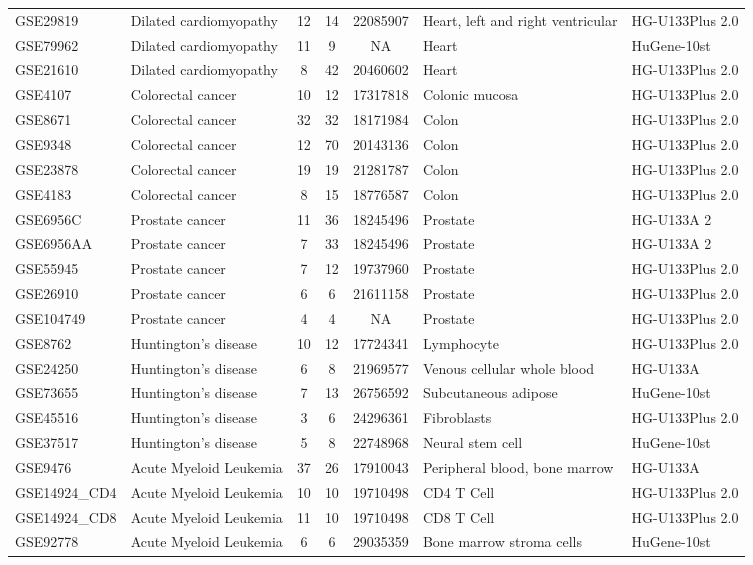 \documentclass[Minh_PhD_thesis.tex]{subfiles}
\begin{document}
\begin{landscape}
\begin{longtable}{lp{4cm}cccp{4cm}l}
GSE29819	&Dilated cardiomyopathy	&12	&14	&22085907	&Heart, left and right ventricular	&HG-U133Plus 2.0\\
GSE79962	&Dilated cardiomyopathy	&11	&9	&NA	&Heart	&HuGene-10st\\
GSE21610	&Dilated cardiomyopathy	&8	&42	&20460602	&Heart	&HG-U133Plus 2.0\\
GSE4107	&Colorectal cancer	&10	&12	&17317818	&Colonic mucosa	&HG-U133Plus 2.0\\
GSE8671	&Colorectal cancer	&32	&32	&18171984	&Colon	&HG-U133Plus 2.0\\
GSE9348	&Colorectal cancer	&12	&70	&20143136	&Colon	&HG-U133Plus 2.0\\
GSE23878	&Colorectal cancer	&19	&19	&21281787	&Colon	&HG-U133Plus 2.0\\
GSE4183	&Colorectal cancer	&8	&15	&18776587	&Colon	&HG-U133Plus 2.0\\
GSE6956C	&Prostate cancer	&11	&36	&18245496	&Prostate	&HG-U133A 2\\
GSE6956AA	&Prostate cancer	&7	&33	&18245496	&Prostate	&HG-U133A 2\\
GSE55945	&Prostate cancer	&7	&12	&19737960	&Prostate	&HG-U133Plus 2.0\\
GSE26910	&Prostate cancer	&6	&6	&21611158	&Prostate	&HG-U133Plus 2.0\\
GSE104749	&Prostate cancer	&4	&4	&NA	&Prostate	&HG-U133Plus 2.0\\
GSE8762	&Huntington’s disease	&10	&12	&17724341	&Lymphocyte	&HG-U133Plus 2.0\\
GSE24250	&Huntington’s disease	&6	&8	&21969577	&Venous cellular whole blood	&HG-U133A\\
GSE73655	&Huntington’s disease	&7	&13	&26756592	&Subcutaneous adipose	&HuGene-10st\\
GSE45516	&Huntington’s disease	&3	&6	&24296361	&Fibroblasts	&HG-U133Plus 2.0\\
GSE37517	&Huntington’s disease	&5	&8	&22748968	&Neural stem cell	&HuGene-10st\\
GSE9476	&Acute Myeloid Leukemia	&37	&26	&17910043	&Peripheral blood, bone marrow	&HG-U133A\\
GSE14924\_CD4	&Acute Myeloid Leukemia&	10	&10	&19710498	&CD4 T Cell	&HG-U133Plus 2.0\\
GSE14924\_CD8	&Acute Myeloid Leukemia		&11	&10	&19710498	&CD8 T Cell	&HG-U133Plus 2.0\\
GSE92778	&Acute Myeloid Leukemia	&6	&6	&29035359	&Bone marrow stroma cells	&HuGene-10st\\

\end{longtable}
\end{landscape}
\end{document}

